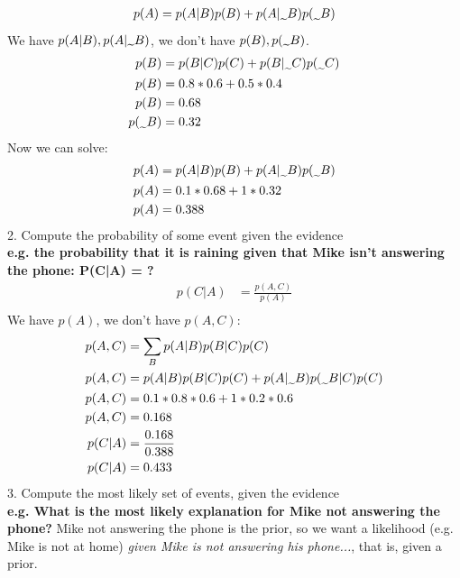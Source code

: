 \begin{align*}
    p(A) & = p(A|B)p(B) + p(A|\midtilde B) p(\midtilde B) \\
\end{align*}
We have $p(A|B), p(A|\midtilde B)$, we don't have $p(B), p(\midtilde B)$.
\begin{align*}
    p(B) & = p(B|C)p(C) + p(B|\midtilde C)p(\midtilde C) \\
    p(B) & = 0.8*0.6 + 0.5*0.4 \\
    p(B) & = 0.68 \\
    p(\midtilde B) & = 0.32 \\
\end{align*}
Now we can solve:
\begin{align*}
    p(A) & = p(A|B)p(B) + p(A|\midtilde B) p(\midtilde B) \\
    p(A) & = 0.1*0.68+1*0.32 \\
    p(A) & = 0.388 \\
\end{align*}
2. Compute the probability of some event given the evidence\\
\textbf{e.g. the probability that it is raining given that Mike isn’t answering the phone: P(C|A) = ?} \\
\begin{align*}
    p(C|A) & = \frac{p(A,C)}{p(A)} \\
\end{align*}
We have $p(A)$, we don't have $p(A,C)$:
\begin{align*}
    p(A,C) & = \sum_B p(A|B)p(B|C)p(C) \\
    p(A,C) & = p(A|B)p(B|C)p(C) + p(A|\midtilde B)p(\midtilde B|C)p(C) \\
    p(A,C) & = 0.1*0.8*0.6+1*0.2*0.6 \\
    p(A,C) & = 0.168 \\
    p(C|A) & = \frac{0.168}{0.388} \\
    p(C|A) & = 0.433 \\
\end{align*}
3. Compute the most likely set of events, given the evidence \\
\textbf{e.g. What is the most likely explanation for Mike not answering the phone?} Mike not answering the phone is the prior, so we want a likelihood (e.g. Mike is not at home) \textit{given Mike is not answering his phone...}, that is, given a prior.\\
